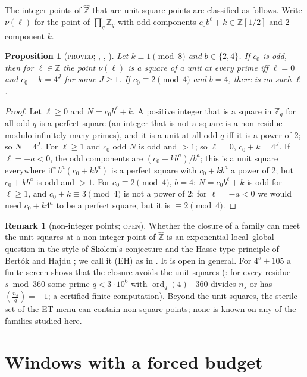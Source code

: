 \documentclass[11pt,reqno]{amsart}
\newtheorem{proposition}[theorem]{Proposition}
\theoremstyle{definition}
\newtheorem{remark}[theorem]{Remark}
\newcommand{\Z}{\mathbb Z}
\newcommand{\Zh}{\widehat{\Z}}
\newcommand{\ord}{\operatorname{ord}}
\newcommand{\leg}[2]{\left(\frac{#1}{#2}\right)}
\newcommand{\status}[1]{\textup{\textsc{#1}}}
\begin{document}
The integer points of $\Zh$ that are unit-square points are classified as
follows.  Write $\nu(\ell)$ for the point of $\prod_q\Z_q$ with odd
components $c_0b^\ell+k\in\Z[1/2]$ and $2$-component $k$.

\begin{proposition}[\status{proved}; {\cite[Cor.~1.5]{ExpCov}, \cite[Lemma~3.1]{ExpNearSq}, \cite[Lemma~1.2]{SignFields}}]\label{prop:intpoints}
Let $k\equiv1\pmod 8$ and $b\in\{2,4\}$.  If $c_0$ is odd, then for
$\ell\in\Z$ the point $\nu(\ell)$ is a square of a unit at every prime iff
$\ell=0$ and $c_0+k=4^J$ for some $J\ge1$.  If $c_0\equiv2\pmod 4$ and $b=4$,
there is no such $\ell$.
\end{proposition}

\begin{proof}
Let $\ell\ge0$ and $N=c_0b^\ell+k$.  A positive integer that is a square in
$\Z_q$ for all odd $q$ is a perfect square (an integer that is not a
square is a non-residue modulo infinitely many primes), and it is a unit at
all odd $q$ iff it is a power of $2$; so $N=4^J$.  For $\ell\ge1$ and $c_0$
odd $N$ is odd and $>1$; so $\ell=0$, $c_0+k=4^J$.  If
$\ell=-a<0$, the odd components are $(c_0+kb^{a})/b^{a}$; this is a unit
square everywhere iff $b^a(c_0+kb^a)$ is a perfect square with
$c_0+kb^a$ a power of $2$; but $c_0+kb^a$ is odd and $>1$.  For
$c_0\equiv2\pmod4$, $b=4$: $N=c_0b^\ell+k$ is odd for $\ell\ge1$, and
$c_0+k\equiv3\pmod 4$ is not a power of $2$; for $\ell=-a<0$ we would need
$c_0+k4^a$ to be a perfect square, but it is $\equiv2\pmod4$.
\end{proof}

\begin{remark}[non-integer points; \status{open}]\label{rem:EH}
Whether the closure of a family can meet the unit squares at a
non-integer point of $\Zh$ is an exponential local--global question in the
style of Skolem's conjecture and the Hasse-type principle of
Bert\'ok and Hajdu \cite{BH}; we call it (EH) as in \cite[\S3]{ExpCov}.  It
is open in general.  For $4^s+105$ a finite screen shows that the closure
avoids the unit squares (\cite[\S1.4]{SignFields}: for every residue
$s\bmod360$ some prime $q<3\cdot10^6$ with $\ord_q(4)\mid360$ divides
$n_s$ or has $\leg{n_s}q=-1$; a certified finite computation).  Beyond the
unit squares, the sterile set of the ET menu can contain non-square points;
none is known on any of the families studied here.
\end{remark}

\section{Windows with a forced budget}\label{sec:forced}
\end{document}
